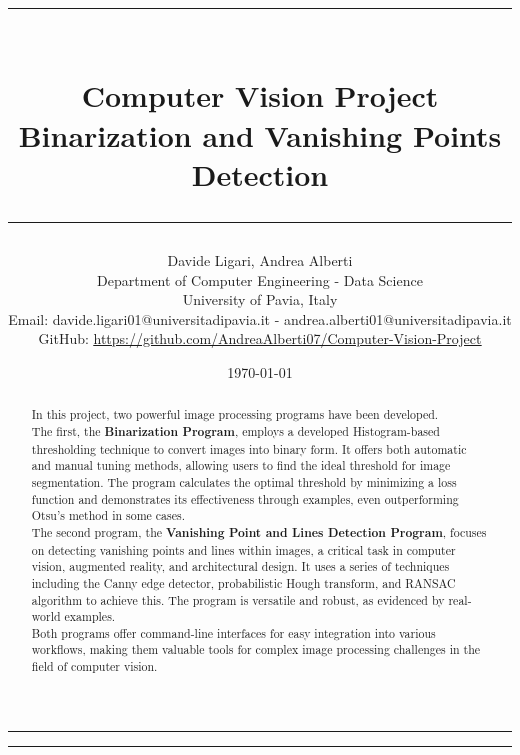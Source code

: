 \documentclass{class}
\title{
    \rule{\textwidth}{0.3pt}\vspace{0.3cm}\\
    \textbf{Computer Vision Project}\vspace{0.2cm}\\
    \large{Binarization and Vanishing Points Detection}
    \rule{\textwidth}{0.3pt}\vspace{0.5cm}}
\author{Davide Ligari, Andrea Alberti\vspace{0.2cm}\\
    \small Department of Computer Engineering - Data Science\\
    \small University of Pavia, Italy \\
    \small Email: davide.ligari01@universitadipavia.it - andrea.alberti01@universitadipavia.it \\
    \small GitHub: \href{https://github.com/AndreaAlberti07/Computer-Vision-Project}{\underline{https://github.com/AndreaAlberti07/Computer-Vision-Project}}
    \vspace{0.5cm}}
\date{\today}
\begin{document}
\begin{titlepage}

    \maketitle
    \thispagestyle{empty}

    \begin{multicols*}{2}

        \hrule
        \begin{abstract}
            \noindent
            In this project, two powerful image processing programs have been developed.\\
            The first, the \textbf{Binarization Program}, employs a developed Histogram-based thresholding technique to
            convert images into binary form. It offers both automatic and manual tuning methods, allowing users to find
            the ideal threshold for image segmentation. The program calculates the optimal threshold by minimizing a loss
            function and demonstrates its effectiveness through examples, even outperforming Otsu's method in some cases.\\
            The second program, the \textbf{Vanishing Point and Lines Detection Program}, focuses on detecting vanishing
            points and lines within images, a critical task in computer vision, augmented reality, and architectural design.
            It uses a series of techniques including the Canny edge detector, probabilistic Hough transform, and RANSAC
            algorithm to achieve this. The program is versatile and robust, as evidenced by real-world examples.\\
            Both programs offer command-line interfaces for easy integration into various workflows,
            making them valuable tools for complex image processing challenges in the field of computer vision.
            \\
        \end{abstract}
        \newcolumn
        \hrule
        \tableofcontents
    \end{multicols*}
\end{titlepage}

\clearpage
\pagestyle{FirstPage}

\clearpage

\end{document}
